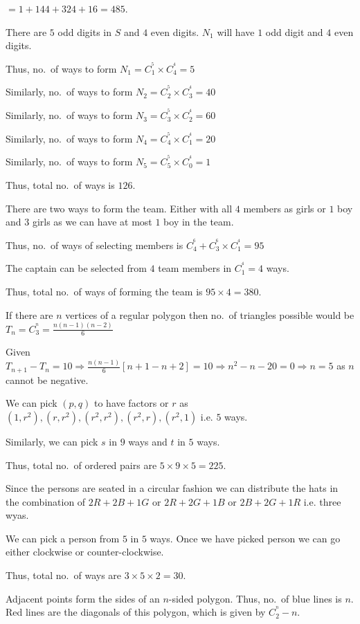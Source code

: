   $= 1 + 144 + 324 + 16 = 485$.
\item There are $5$ odd digits in $S$ and $4$ even digits. $N_1$ will have $1$ odd digit and $4$ even
  digits.

  Thus, no.\ of ways to form $N_1 = C_1^^5\times C_4^^4 = 5$

  Similarly, no.\ of ways to form $N_2 = C_2^^5\times C_3^^4 = 40$

  Similarly, no.\ of ways to form $N_3 = C_3^^5\times C_2^^4 = 60$

  Similarly, no.\ of ways to form $N_4 = C_4^^5\times C_1^^4 = 20$

  Similarly, no.\ of ways to form $N_5 = C_5^^5\times C_0^^4 = 1$

  Thus, total no.\ of ways is $126$.
\item There are two ways to form the team. Either with all $4$ members as girls or $1$ boy and $3$ girls as
  we can have at most $1$ boy in the team.

  Thus, no.\ of ways of selecting members is $C_4^^6 + C_3^^6\times C_1^^4 = 95$

  The captain can be selected from $4$ team members in $C_1^^4 = 4$ ways.

  Thus, total no.\ of ways of forming the team is $95\times4 = 380$.
\item If there are $n$ vertices of a regular polygon then no.\ of triangles possible would be $T_n = C_3^^n
  = \frac{n(n - 1)(n - 2)}{6}$

  Given $T_{n + 1} - T_n = 10 \Rightarrow \frac{n(n - 1)}{6}[n + 1 - n + 2] = 10 \Rightarrow n^2 - n - 20 =
  0\Rightarrow n = 5$ as $n$ cannot be negative.
\item We can pick $(p, q)$ to have factors or $r$ as $\left(1, r^2\right), \left(r, r^2\right), \left(r^2,
  r^2\right), \left(r^2, r\right), \left(r^2, 1\right)$ i.e. $5$ ways.

  Similarly, we can pick $s$ in $9$ ways and $t$ in $5$ ways.

  Thus, total no.\  of ordered pairs are $5\times9\times 5 = 225$.
\item Since the persons are seated in a circular fashion we can distribute the hats in the combination of
  $2R + 2B + 1G$ or $2R + 2G + 1B$ or $2B + 2G + 1R$ i.e. three wyas.

  We can pick a person from $5$ in $5$ ways. Once we have picked person we can go either clockwise or
  counter-clockwise.

  Thus, total no.\ of ways are $3\times5\times 2 = 30$.
\item Adjacent points form the sides of an $n$-sided polygon. Thus, no.\ of blue lines is $n$. Red lines are
  the diagonals of this polygon, which is given by $C_2^^n - n$.


